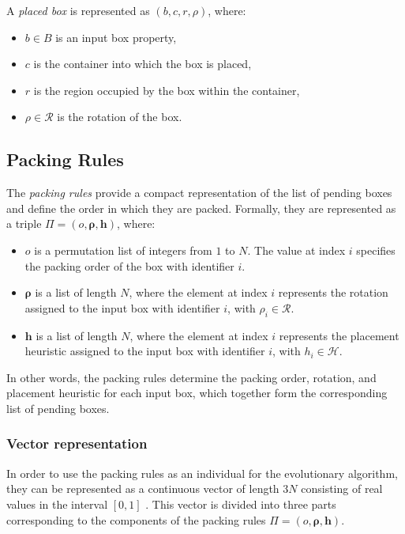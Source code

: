 A \emph{placed box} is represented as $(b, c, r, \rho)$, where:
\begin{itemize}
    \item $b \in B$ is an input box property,
    \item $c$ is the container into which the box is placed,
    \item $r$ is the region occupied by the box within the container,
    \item $\rho \in \mathcal{R}$ is the rotation of the box.
\end{itemize}



\subsection{Packing Rules}

The \emph{packing rules} provide a compact representation of the list of pending boxes and define the order in which they are packed. 
Formally, they are represented as a triple $\Pi = (o, \boldsymbol{\rho}, \mathbf{h})$, where:
\begin{itemize}
    \item $o$ is a permutation list of integers from $1$ to $N$. 
    The value at index $i$ specifies the packing order of the box with identifier $i$.
    \item $\boldsymbol{\rho}$ is a list of length $N$, where the element at index $i$ represents the rotation assigned to the input box with identifier $i$, with $\rho_i \in \mathcal{R}$.
    \item $\mathbf{h}$ is a list of length $N$, where the element at index $i$ represents the placement heuristic assigned to the input box with identifier $i$, with $h_i \in \mathcal{H}$.
\end{itemize}

In other words, the packing rules determine the packing order, rotation, and placement heuristic for each input box, which together form the corresponding list of pending boxes.

\subsubsection{Vector representation}
\label{sec:vector-packing-rules}
In order to use the packing rules as an individual for the evolutionary algorithm, they can be represented as a continuous vector of length $3N$ consisting of real values in the interval $[0,1]$ \cite{goncalves2013}.
This vector is divided into three parts corresponding to the components of the packing rules $\Pi = (o, \boldsymbol{\rho}, \mathbf{h})$.

